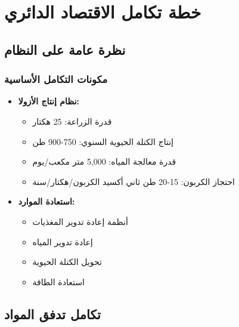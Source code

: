 \section{خطة تكامل الاقتصاد الدائري}

\subsection{نظرة عامة على النظام}

\subsubsection{مكونات التكامل الأساسية}
\begin{itemize}
    \item \textbf{نظام إنتاج الأزولا:}
    \begin{itemize}
        \item قدرة الزراعة: 25 هكتار
        \item إنتاج الكتلة الحيوية السنوي: 750-900 طن
        \item قدرة معالجة المياه: 5,000 متر مكعب/يوم
        \item احتجاز الكربون: 15-20 طن ثاني أكسيد الكربون/هكتار/سنة
    \end{itemize}
    
    \item \textbf{استعادة الموارد:}
    \begin{itemize}
        \item أنظمة إعادة تدوير المغذيات
        \item إعادة تدوير المياه
        \item تحويل الكتلة الحيوية
        \item استعادة الطاقة
    \end{itemize}
\end{itemize}

\subsection{تكامل تدفق المواد}

